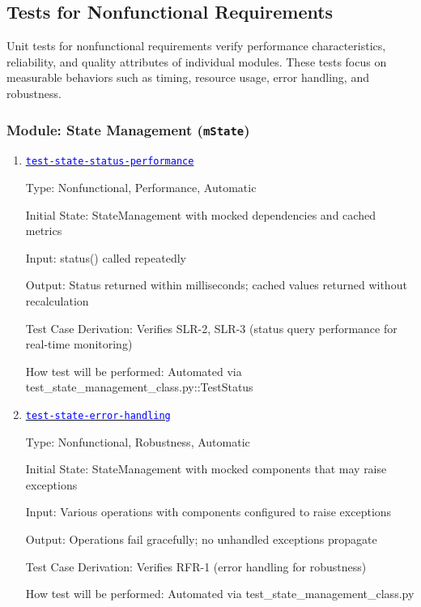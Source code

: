 \documentclass[12pt, titlepage]{article}
\newcommand{\mref}[1]{\texttt{#1}}
\newcommand{\tid}[1]{\hyperlink{tid:#1}{\textcolor{blue}{\texttt{#1}}}}
\begin{document}
\subsection{Tests for Nonfunctional Requirements}

Unit tests for nonfunctional requirements verify performance characteristics,
reliability, and quality attributes of individual modules. These tests focus on
measurable behaviors such as timing, resource usage, error handling, and
robustness.

\subsubsection{Module: State Management (\mref{mState})}

\begin{enumerate}

  \item{\tid{test-state-status-performance}\\}

        Type: Nonfunctional, Performance, Automatic

        Initial State: StateManagement with mocked dependencies and cached metrics

        Input: status() called repeatedly

        Output: Status returned within milliseconds; cached values returned without
        recalculation

        Test Case Derivation: Verifies SLR-2, SLR-3 (status query performance for
        real-time monitoring)

        How test will be performed: Automated via
        test\_state\_management\_class.py::TestStatus

  \item{\tid{test-state-error-handling}\\}

        Type: Nonfunctional, Robustness, Automatic

        Initial State: StateManagement with mocked components that may raise exceptions

        Input: Various operations with components configured to raise exceptions

        Output: Operations fail gracefully; no unhandled exceptions propagate

        Test Case Derivation: Verifies RFR-1 (error handling for robustness)

        How test will be performed: Automated via test\_state\_management\_class.py

\end{enumerate}
\end{document}
